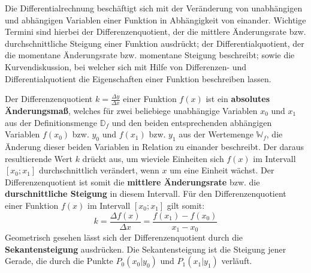 



\thispagestyle{plain}


Die Differentialrechnung besch\"{a}ftigt sich mit der Ver\"{a}nderung von unabh\"{a}ngigen und abh\"{a}ngigen Variablen einer Funktion in Abh\"{a}ngigkeit von einander. Wichtige Termini sind hierbei der Differenzenquotient, der die mittlere \"{A}nderungsrate bzw. durchschnittliche Steigung einer Funktion ausdr\"{u}ckt; der Differentialquotient, der die momentane \"{A}nderungsrate bzw. momentane Steigung beschreibt; sowie die Kurvendiskussion, bei welcher sich mit Hilfe von Differenzen- und Differentialquotient die Eigenschaften einer Funktion beschreiben lassen.


Der Differenzenquotient $k = \frac{\Delta y}{\Delta x}$ einer Funktion $f(x)$ ist ein \textbf{absolutes \"{A}nderungsma\ss{}}, welches f\"{u}r zwei beliebiege unabh\"{a}ngige Variablen $x_{0}$ und $x_{1}$ aus der Definitionsmenge $\mathbb{D}_{f}$ und den beiden entsprechenden abh\"{a}ngigen Variablen $f(x_{0})$ bzw. $y_{0}$ und $f(x_{1})$ bzw. $y_{1}$ aus der Wertemenge $\mathbb{W}_{f}$, die \"{A}nderung dieser beiden Variablen in Relation zu einander beschreibt. Der daraus resultierende Wert $k$ dr\"{u}ckt aus, um wieviele Einheiten sich $f(x)$ im Intervall $[x_{0} ; x_{1}]$ durchschnittlich ver\"{a}ndert, wenn $x$ um eine Einheit w\"{a}chst. Der Differenzenquotient ist somit die \textbf{mittlere \"{A}nderungsrate} bzw. die \textbf{durschnittliche Steigung} in diesem Intervall. F\"{u}r den Differenzenquotient einer Funktion $f(x)$ im Intervall $[x_{0} ; x_{1}]$ gilt somit: $$k = \frac{\Delta f(x)}{\Delta x} = \frac{f(x_{1}) - f(x_{0})}{x_{1} - x_{0}}$$ Geometrisch gesehen l\"{a}sst sich der Differenzenquotient durch die \textbf{Sekantensteigung} ausdr\"{u}cken. Die Sekantensteigung ist die Steigung jener Gerade, die durch die Punkte $P_{0}(x_{0}|y_{0})$ und $P_{1}(x_{1}|y_{1})$ verl\"{a}uft.

\vspace{1cm}


